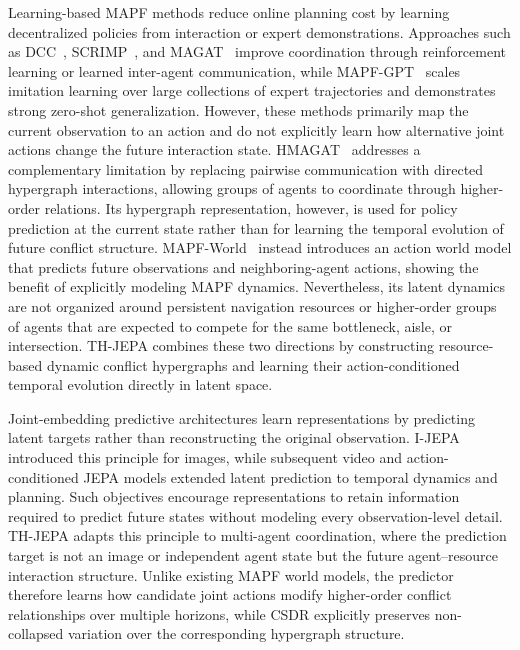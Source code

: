\documentclass{article} %
\begin{document}
Learning-based MAPF methods reduce online planning cost by learning decentralized policies from interaction or expert demonstrations. Approaches such as DCC~\cite{ma2021dcc}, SCRIMP~\cite{wang2023scrimp}, and MAGAT~\cite{li2021magat} improve coordination through reinforcement learning or learned inter-agent communication, while MAPF-GPT~\cite{andreychuk2025mapf} scales imitation learning over large collections of expert trajectories and demonstrates strong zero-shot generalization. However, these methods primarily map the current observation to an action and do not explicitly learn how alternative joint actions change the future interaction state. HMAGAT~\cite{jain2026hmagat} addresses a complementary limitation by replacing pairwise communication with directed hypergraph interactions, allowing groups of agents to coordinate through higher-order relations. Its hypergraph representation, however, is used for policy prediction at the current state rather than for learning the temporal evolution of future conflict structure. MAPF-World~\cite{yang2025mapfworld} instead introduces an action world model that predicts future observations and neighboring-agent actions, showing the benefit of explicitly modeling MAPF dynamics. Nevertheless, its latent dynamics are not organized around persistent navigation resources or higher-order groups of agents that are expected to compete for the same bottleneck, aisle, or intersection. TH-JEPA combines these two directions by constructing resource-based dynamic conflict hypergraphs and learning their action-conditioned temporal evolution directly in latent space.

Joint-embedding predictive architectures learn representations by predicting latent targets rather than reconstructing the original observation. I-JEPA~\cite{assran2023ijepa} introduced this principle for images, while subsequent video and action-conditioned JEPA models extended latent prediction to temporal dynamics and planning. Such objectives encourage representations to retain information required to predict future states without modeling every observation-level detail. TH-JEPA adapts this principle to multi-agent coordination, where the prediction target is not an image or independent agent state but the future agent--resource interaction structure. Unlike existing MAPF world models, the predictor therefore learns how candidate joint actions modify higher-order conflict relationships over multiple horizons, while CSDR explicitly preserves non-collapsed variation over the corresponding hypergraph structure.
\end{document}
